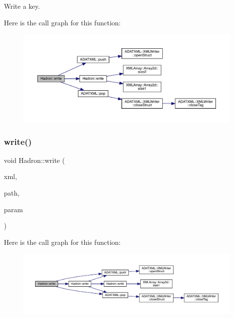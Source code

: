 Write a key. 

Here is the call graph for this function\+:\nopagebreak
\begin{figure}[H]
\begin{center}
\leavevmode
\includegraphics[width=350pt]{d1/daf/namespaceHadron_a97758f7d26a76e70e4c61d4409eff7a6_cgraph}
\end{center}
\end{figure}
\mbox{\label{namespaceHadron_add6d43a3a15c934d9c3e98989588d22e}} 
\subsubsection{\texorpdfstring{write()}{write()}\hspace{0.1cm}{\footnotesize\ttfamily [42/95]}}
{\footnotesize\ttfamily void Hadron\+::write (\begin{DoxyParamCaption}\item[{\mbox{\hyperlink{classADATXML_1_1XMLWriter}{X\+M\+L\+Writer}} \&}]{xml,  }\item[{const std\+::string \&}]{path,  }\item[{const \mbox{\hyperlink{structHadron_1_1HadronAdjMapTarget__t}{Hadron\+Adj\+Map\+Target\+\_\+t}} \&}]{param }\end{DoxyParamCaption})}

Here is the call graph for this function\+:\nopagebreak
\begin{figure}[H]
\begin{center}
\leavevmode
\includegraphics[width=350pt]{d1/daf/namespaceHadron_add6d43a3a15c934d9c3e98989588d22e_cgraph}
\end{center}
\end{figure}
\mbox{\label{namespaceHadron_a4c0a824fa457c4fbaac034c83f5554c5}} 
